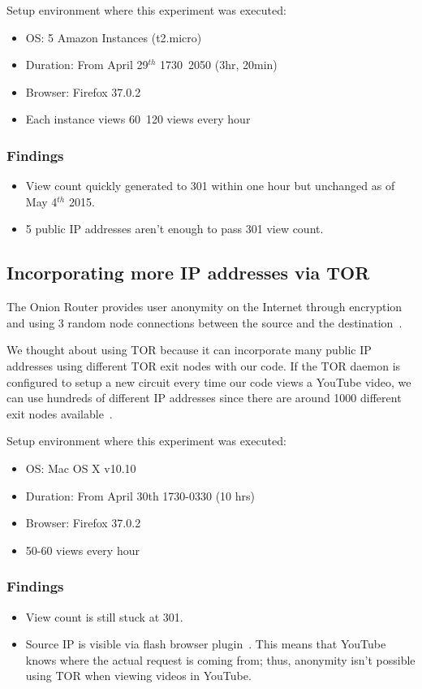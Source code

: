 \documentclass[conference]{IEEEtran}
\begin{document}
Setup environment where this experiment was executed:
\begin{itemize}
  \setlength\itemsep{-0.1em}
  \item OS: 5 Amazon Instances (t2.micro)
  \item Duration: From April 29$^{th}$ 1730~2050 (3hr, 20min)
  \item Browser: Firefox 37.0.2
  \item Each instance views 60~120 views every hour
\end{itemize}

\subsubsection*{Findings}
\begin{itemize}
  \setlength\itemsep{-0.1em}
  \item View count quickly generated to 301 within one hour but unchanged as of May 4$^{th}$ 2015.
  \item 5 public IP addresses aren't enough to pass 301 view count.
\end{itemize}


\subsection{Incorporating more IP addresses via TOR}

The Onion Router provides user anonymity on the Internet through encryption and using 3 random node connections between the source and the destination~\cite{c14}.

We thought about using TOR because it can incorporate many public IP addresses using different TOR exit nodes with our code. If the TOR daemon is configured to setup a new circuit every time our code views a YouTube video, we can use hundreds of different IP addresses since there are around 1000 different exit nodes available~\cite{c15}.

Setup environment where this experiment was executed:
\begin{itemize}
  \setlength\itemsep{-0.1em}
  \item OS: Mac OS X v10.10
  \item Duration: From April 30th 1730-0330 (10 hrs)
  \item Browser: Firefox 37.0.2
  \item 50-60 views every hour
\end{itemize}

\subsubsection*{Findings}
\begin{itemize}
  \setlength\itemsep{-0.1em}
  \item View count is still stuck at 301.
  \item Source IP is visible via flash browser plugin~\cite{c14}. This means that YouTube knows where the actual request is coming from; thus, anonymity isn't possible using TOR when viewing videos in YouTube.
\end{itemize}
\end{document}
